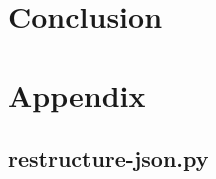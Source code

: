 \documentclass{report}
\begin{document}
\newpage

\chapter{Conclusion}

\newpage



\newpage

\chapter{Appendix}
\section{restructure-json.py}
\end{document}
